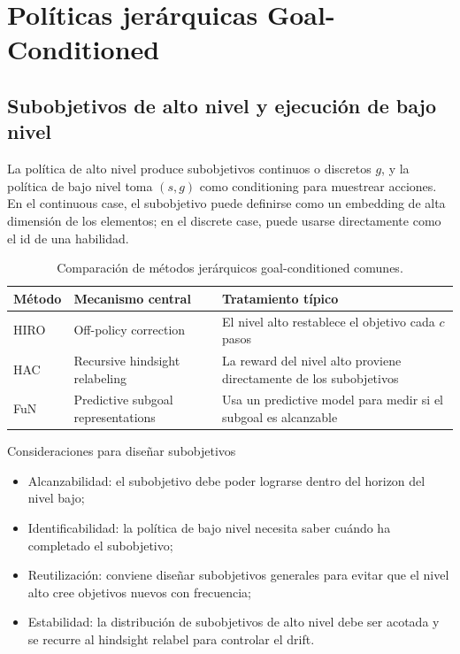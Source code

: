\section{Políticas jerárquicas Goal-Conditioned}

\subsection{Subobjetivos de alto nivel y ejecución de bajo nivel}

La política de alto nivel produce subobjetivos continuos o discretos \(g\), y la política de bajo nivel toma \((s, g)\) como conditioning para muestrear acciones. En el continuous case, el subobjetivo puede definirse como un embedding de alta dimensión de los elementos; en el discrete case, puede usarse directamente como el id de una habilidad.

\begin{table}[H]
\centering
\begin{tabular}{p{3cm}p{5cm}p{4cm}}
\toprule
Método & Mecanismo central & Tratamiento típico \\
\midrule
HIRO & Off-policy correction & El nivel alto restablece el objetivo cada $c$ pasos \\
HAC & Recursive hindsight relabeling & La reward del nivel alto proviene directamente de los subobjetivos \\
FuN & Predictive subgoal representations & Usa un predictive model para medir si el subgoal es alcanzable \\
\bottomrule
\end{tabular}
\caption{Comparación de métodos jerárquicos goal-conditioned comunes.}
\end{table}

\begin{knowledgebox}{Consideraciones para diseñar subobjetivos}
\begin{itemize}
    \item Alcanzabilidad: el subobjetivo debe poder lograrse dentro del horizon del nivel bajo;
    \item Identificabilidad: la política de bajo nivel necesita saber cuándo ha completado el subobjetivo;
    \item Reutilización: conviene diseñar subobjetivos generales para evitar que el nivel alto cree objetivos nuevos con frecuencia;
    \item Estabilidad: la distribución de subobjetivos de alto nivel debe ser acotada y se recurre al hindsight relabel para controlar el drift.
\end{itemize}
\end{knowledgebox}

